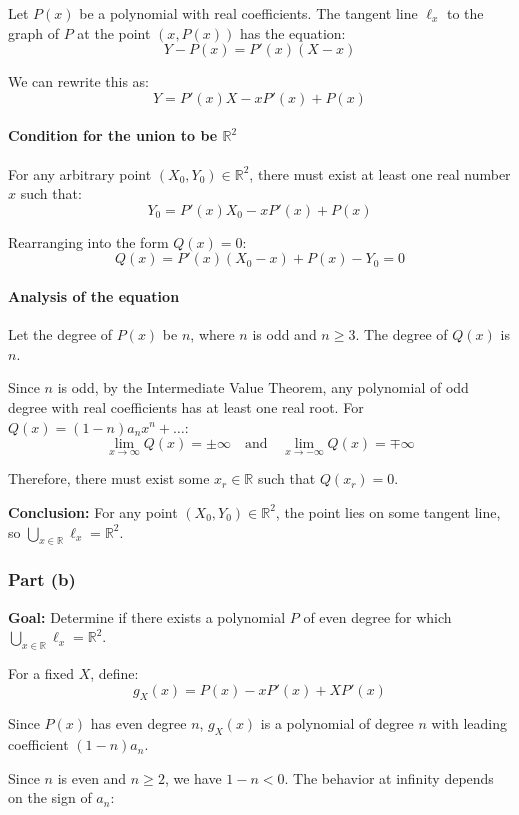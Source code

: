 \documentclass[12pt,a4paper]{article}
\theoremstyle{definition}
\begin{document}
Let $P(x)$ be a polynomial with real coefficients. The tangent line $\ell_x$ to the graph of $P$ at the point $(x, P(x))$ has the equation:
\[Y - P(x) = P'(x) (X - x)\]

We can rewrite this as:
\[Y = P'(x)X - xP'(x) + P(x)\]

\paragraph{Condition for the union to be $\mathbb{R}^2$}

For any arbitrary point $(X_0, Y_0) \in \mathbb{R}^2$, there must exist at least one real number $x$ such that:
\[Y_0 = P'(x)X_0 - xP'(x) + P(x)\]

Rearranging into the form $Q(x) = 0$:
\[Q(x) = P'(x)(X_0 - x) + P(x) - Y_0 = 0\]

\paragraph{Analysis of the equation}

Let the degree of $P(x)$ be $n$, where $n$ is odd and $n \geq 3$. The degree of $Q(x)$ is $n$.

Since $n$ is odd, by the Intermediate Value Theorem, any polynomial of odd degree with real coefficients has at least one real root. For $Q(x) = (1-n) a_n x^n + \dots$:
\[\lim_{x\to\infty} Q(x) = \pm\infty \quad \text{and} \quad \lim_{x\to-\infty} Q(x) = \mp\infty\]

Therefore, there must exist some $x_r \in \mathbb{R}$ such that $Q(x_r) = 0$.

\textbf{Conclusion:} For any point $(X_0, Y_0) \in \mathbb{R}^2$, the point lies on some tangent line, so $\bigcup_{x\in\mathbb{R}}\ell_x = \mathbb{R}^2$.

\subsubsection*{Part (b)}

\textbf{Goal:} Determine if there exists a polynomial $P$ of even degree for which $\bigcup_{x\in\mathbb{R}}\ell_x = \mathbb{R}^2$.

For a fixed $X$, define:
\[g_X(x) = P(x) - xP'(x) + X P'(x)\]

Since $P(x)$ has even degree $n$, $g_X(x)$ is a polynomial of degree $n$ with leading coefficient $(1-n)a_n$.

Since $n$ is even and $n \geq 2$, we have $1-n < 0$. The behavior at infinity depends on the sign of $a_n$:
\end{document}
